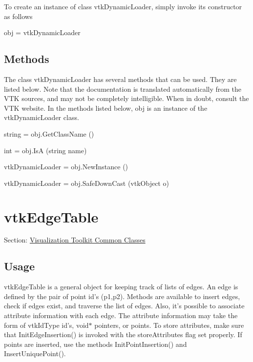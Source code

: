 To create an instance of class vtk\-Dynamic\-Loader, simply invoke its constructor as follows \begin{DoxyVerb}  obj = vtkDynamicLoader
\end{DoxyVerb}
 \hypertarget{vtkwidgets_vtkxyplotwidget_Methods}{}\subsection{Methods}\label{vtkwidgets_vtkxyplotwidget_Methods}
The class vtk\-Dynamic\-Loader has several methods that can be used. They are listed below. Note that the documentation is translated automatically from the V\-T\-K sources, and may not be completely intelligible. When in doubt, consult the V\-T\-K website. In the methods listed below, {\ttfamily obj} is an instance of the vtk\-Dynamic\-Loader class. 
\begin{DoxyItemize}
\item {\ttfamily string = obj.\-Get\-Class\-Name ()}  
\item {\ttfamily int = obj.\-Is\-A (string name)}  
\item {\ttfamily vtk\-Dynamic\-Loader = obj.\-New\-Instance ()}  
\item {\ttfamily vtk\-Dynamic\-Loader = obj.\-Safe\-Down\-Cast (vtk\-Object o)}  
\end{DoxyItemize}\hypertarget{vtkcommon_vtkedgetable}{}\section{vtk\-Edge\-Table}\label{vtkcommon_vtkedgetable}
Section\-: \hyperlink{sec_vtkcommon}{Visualization Toolkit Common Classes} \hypertarget{vtkwidgets_vtkxyplotwidget_Usage}{}\subsection{Usage}\label{vtkwidgets_vtkxyplotwidget_Usage}
vtk\-Edge\-Table is a general object for keeping track of lists of edges. An edge is defined by the pair of point id's (p1,p2). Methods are available to insert edges, check if edges exist, and traverse the list of edges. Also, it's possible to associate attribute information with each edge. The attribute information may take the form of vtk\-Id\-Type id's, void$\ast$ pointers, or points. To store attributes, make sure that Init\-Edge\-Insertion() is invoked with the store\-Attributes flag set properly. If points are inserted, use the methods Init\-Point\-Insertion() and Insert\-Unique\-Point().

